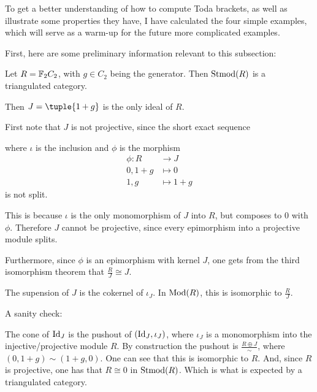 To get a better understanding of how to compute Toda brackets, as well as illustrate some properties they have, I have calculated the four simple examples, which will serve as a warm-up for the future more complicated examples.

First, here are some preliminary information relevant to this subsection:

Let \( R = {\mathbb{F}}_2C_2 \), with \( g \in C_2 \) being the generator. Then \( \operatorname{Stmod}(R) \) is a triangulated category.

Then \( J = \tuple{1 + g} \) is the only ideal of \( R \).

First note that \( J \) is not projective, since the short exact sequence
\begin{center}
\end{center}
where \( \iota \) is the inclusion and \( \phi \) is the morphism
\begin{align*}
    \phi: R &\to J \\
    0, 1 + g &\mapsto 0 \\
    1, g &\mapsto 1 + g
\end{align*}
is not split.

This is because \( \iota \) is the only monomorphism of \( J \) into \( R \), but composes to \( 0 \) with \( \phi \). Therefore \( J \) cannot be projective, since every epimorphism into a projective module splits.

Furthermore, since \( \phi \) is an epimorphism with kernel \( J \), one gets from the third isomorphism theorem that \( \frac{R}{J} \cong J \).

The supension of \( J \) is the cokernel of \( \iota_J \). In \( \operatorname{Mod}(R) \), this is isomorphic to \( \frac{R}{J} \).

A sanity check:

The cone of \( \operatorname{Id}_J \) is the pushout of \( (\operatorname{Id}_J, \iota_J) \), where \( \iota_J \) is a monomorphism into the injective/projective module \( R \). By construction the pushout is \( \frac{R \oplus J}{\sim} \), where \( (0, 1+g) \sim (1+g, 0) \). One can see that this is isomorphic to \( R \). And, since \( R \) is projective, one has that \( R \cong 0 \) in \( \operatorname{Stmod}(R) \). Which is what is expected by a triangulated category.








